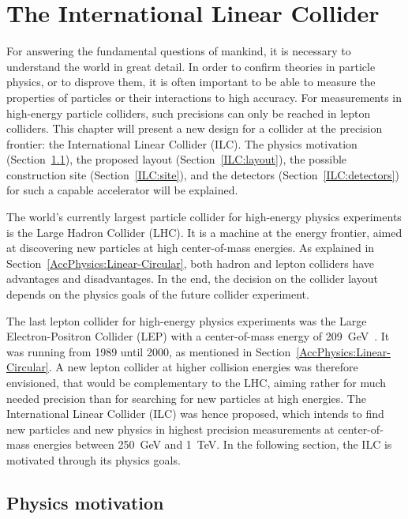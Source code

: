 \chapter{The International Linear Collider}
\label{ILC}
\begin{chapterabstract}
For answering the fundamental questions of mankind, it is necessary to understand the world in great detail.
In order to confirm theories in particle physics, or to disprove them, it is often important to be able to measure the properties of particles or their interactions to high accuracy.
For measurements in high-energy particle colliders, such precisions can only be reached in lepton colliders.
This chapter will present a new design for a collider at the precision frontier: the International Linear Collider (ILC). 
The physics motivation (Section~\ref{ILC:physicsmotivation}), the proposed layout (Section~\ref{ILC:layout}), the possible construction site (Section~\ref{ILC:site}), and the detectors (Section~\ref{ILC:detectors}) for such a capable accelerator will be explained.
\end{chapterabstract}
\vspace*{0.5cm}\newline
\noindent
The world's currently largest particle collider for high-energy physics experiments is the Large Hadron Collider (LHC).
It is a machine at the energy frontier, aimed at discovering new particles at high center-of-mass energies.
As explained in Section~\ref{AccPhysics:Linear-Circular}, both hadron and lepton colliders have advantages and disadvantages.
In the end, the decision on the collider layout depends on the physics goals of the future collider experiment.

The last lepton collider for high-energy physics experiments was the Large Electron-Positron Collider (LEP) with a center-of-mass energy of \SI{209}{\GeV}~\cite{LEP}.
It was running from 1989 until 2000, as mentioned in Section~\ref{AccPhysics:Linear-Circular}. 
A new lepton collider at higher collision energies was therefore envisioned, that would be complementary to the LHC, aiming rather for much needed precision than for searching for new particles at high energies.
The International Linear Collider (ILC) was hence proposed, which intends to find new particles and new physics in highest precision measurements at center-of-mass energies between \SI{250}{\GeV} and \SI{1}{\TeV}.
In the following section, the ILC is motivated through its physics goals.

\section{Physics motivation}
\label{ILC:physicsmotivation}

